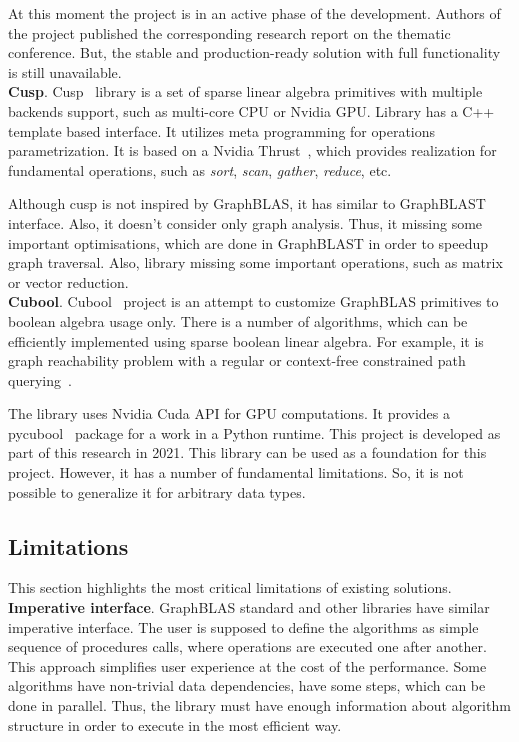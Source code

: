 At this moment the project is in an active phase of the development. Authors of the project published the corresponding research report on the thematic conference. But, the stable and production-ready solution with full functionality is still unavailable.\\

\textbf{Cusp}. Cusp~\cite{net:cusplibrary} library is a set of sparse linear algebra primitives with multiple backends support, such as multi-core CPU or Nvidia GPU. Library has a C++ template based interface. It utilizes meta programming for operations parametrization. It is based on a Nvidia Thrust~\cite{net:cuda_thrust}, which provides realization for fundamental operations, such as \textit{sort}, \textit{scan}, \textit{gather}, \textit{reduce}, etc.

Although cusp is not inspired by GraphBLAS, it has similar to GraphBLAST interface. Also, it doesn't consider only graph analysis. Thus, it missing some important optimisations, which are done in GraphBLAST in order to speedup graph traversal. Also, library missing some important operations, such as matrix or vector reduction.\\

\textbf{Cubool}. Cubool~\cite{net:cubool_project} project is an attempt to customize GraphBLAS primitives to boolean algebra usage only. There is a number of algorithms, which can be efficiently implemented using sparse boolean linear algebra. For example, it is graph reachability problem with a regular or context-free constrained path querying~\cite{inproceedings:cfpq_matrix_evaluation, inbook:kronecker_cfpq_adbis, inproceedings:matrix_cfpq, inproceedings:cfqp_matrix_with_single_source}.

The library uses Nvidia Cuda API for GPU computations. It provides a pycubool~\cite{net:pycubool} package for a work in a Python runtime. This project is developed as part of this research in 2021. This library can be used as a foundation for this project. However, it has a number of fundamental limitations. So, it is not possible to generalize it for arbitrary data types.

\subsection{Limitations}

This section highlights the most critical limitations of existing solutions.\\

\textbf{Imperative interface}. GraphBLAS standard and other libraries have similar imperative interface. The user is supposed to define the algorithms as simple sequence of procedures calls, where operations are executed one after another. This approach simplifies user experience at the cost of the performance. Some algorithms have non-trivial data dependencies, have some steps, which can be done in parallel. Thus, the library must have enough information about algorithm structure in order to execute in the most efficient way.\\

